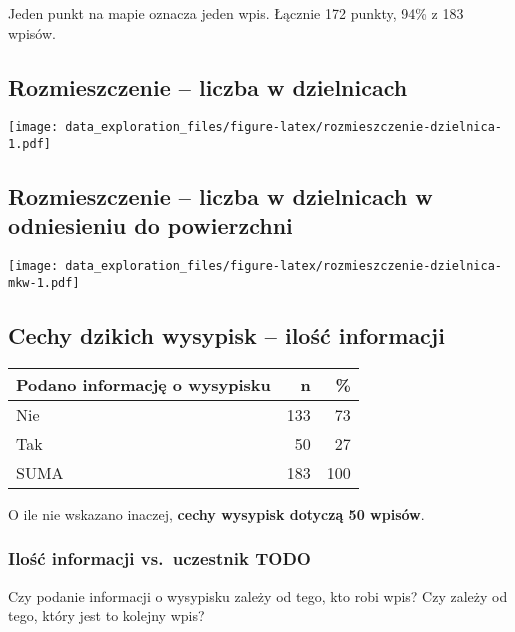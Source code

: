 \documentclass[
]{article}
\begin{document}
Jeden punkt na mapie oznacza jeden wpis. Łącznie 172 punkty, 94\% z 183
wpisów.

\hypertarget{rozmieszczenie-liczba-w-dzielnicach}{%
\subsection{Rozmieszczenie -- liczba w
dzielnicach}\label{rozmieszczenie-liczba-w-dzielnicach}}

\texttt{[image: data\_exploration\_files/figure-latex/rozmieszczenie-dzielnica-1.pdf]}

\hypertarget{rozmieszczenie-liczba-w-dzielnicach-w-odniesieniu-do-powierzchni}{%
\subsection{Rozmieszczenie -- liczba w dzielnicach w odniesieniu do
powierzchni}\label{rozmieszczenie-liczba-w-dzielnicach-w-odniesieniu-do-powierzchni}}

\texttt{[image: data\_exploration\_files/figure-latex/rozmieszczenie-dzielnica-mkw-1.pdf]}

\hypertarget{cechy-dzikich-wysypisk-iloux15bux107-informacji}{%
\subsection{Cechy dzikich wysypisk -- ilość
informacji}\label{cechy-dzikich-wysypisk-iloux15bux107-informacji}}

\begin{table}
\centering
\begin{tabular}[t]{l|r|r}
\hline
Podano informację o wysypisku & n & \%\\
\hline
Nie & 133 & 73\\
\hline
Tak & 50 & 27\\
\hline
SUMA & 183 & 100\\
\hline
\end{tabular}
\end{table}

O ile nie wskazano inaczej, \textbf{cechy wysypisk dotyczą 50 wpisów}.

\hypertarget{iloux15bux107-informacji-vs.-uczestnik-todo}{%
\subsubsection{Ilość informacji vs.~uczestnik
TODO}\label{iloux15bux107-informacji-vs.-uczestnik-todo}}

Czy podanie informacji o wysypisku zależy od tego, kto robi wpis? Czy
zależy od tego, który jest to kolejny wpis?
\end{document}
